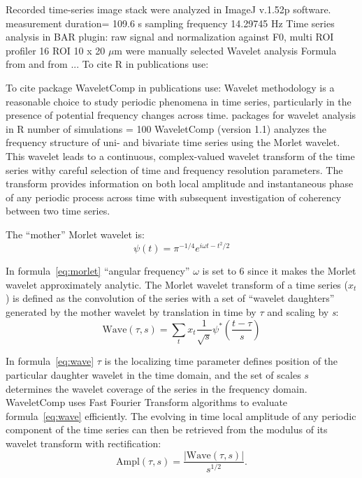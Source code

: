 \documentclass{biophys-new}
\begin{document}
Recorded time-series image stack were analyzed in ImageJ v.1.52p software\cite{rueden2017imagej2}.
measurement duration= 109.6 s sampling frequency 14.29745 Hz
Time series analysis in BAR plugin: raw signal and
normalization against F0, multi ROI profiler
16 ROI 10 x 20 $\mu$m were manually selected
Wavelet analysis
Formula from \cite{grinsted2004application} and from \cite{kahraman2016multiple} ...
To cite R in publications use:  \cite{team2014r}

To cite package WaveletComp in publications use: \cite{rosch2016waveletcomp}
Wavelet methodology is a reasonable choice to study periodic phenomena in time series, particularly in
the presence of potential frequency changes across time.
packages for wavelet analysis in R
number of simulations = 100
WaveletComp (version 1.1) analyzes the frequency structure of uni- and bivariate time series using the Morlet wavelet.
This wavelet leads to a continuous, complex-valued wavelet transform of the time series withy careful selection of time and frequency resolution parameters. The transform provides information on both local amplitude and instantaneous phase of any periodic process across time with subsequent investigation of coherency between two time series.


The “mother” Morlet wavelet is:
\begin{equation}\label{eq:morlet}
\psi(t)=\pi^{-1/4}e^{i\omega t-{t^2}/2}
\end{equation}


In formula~\ref{eq:morlet} “angular frequency” $\omega$ is set to 6 since it makes the Morlet wavelet approximately analytic.
The Morlet wavelet transform of a time series (${x}_{t}$) is defined as the convolution of the series with a set of “wavelet daughters” generated by the mother wavelet by translation in time by $\tau$ and scaling by \textit{s}:
\begin{equation}\label{eq:wave}
\text{Wave}(\tau, s)=\sum_{t}x_{t}\frac{1}{\sqrt{s}}\psi^{\ast}\left(\frac{t-\tau}{s}\right)
\end{equation}

In formula~\ref{eq:wave} $\tau$ is the localizing time parameter defines position of the particular daughter wavelet in the time domain, and the set of scales $s$ determines the wavelet coverage of the series in the frequency domain.
WaveletComp uses Fast Fourier Transform algorithms to evaluate formula~\ref{eq:wave} efficiently.
The evolving in time local amplitude of any periodic component of the time series can then be retrieved from the modulus of its wavelet transform with rectification:
\begin{equation}\label{eq:amplitude}
\text{Ampl}(\tau, s)=\frac{|\text{Wave}(\tau, s)|}{s^{1/2}}.
\end{equation}
\end{document}
